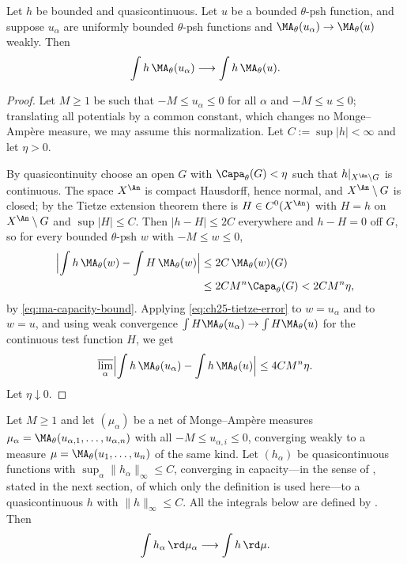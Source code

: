 \begin{lemma}
\label{lem:quasicontinuous-tests}
Let $h$ be bounded and quasicontinuous.  Let $u$ be a bounded
$\theta$-psh function, and suppose $u_\alpha$ are uniformly bounded
$\theta$-psh functions and
$\MA_\theta(u_\alpha)\to\MA_\theta(u)$ weakly. Then
\[
                    \int h\,\MA_\theta(u_\alpha)
                    \longrightarrow\int h\,\MA_\theta(u).
\]
\end{lemma}

\begin{proof}
Let $M\geq1$ be such that $-M\leq u_\alpha\leq0$ for all $\alpha$ and
$-M\leq u\leq0$; translating all potentials by a common constant, which
changes no Monge--Amp\`ere measure, we may assume this normalization.  Let
$C:=\sup|h|<\infty$ and let $\eta>0$.

By quasicontinuity choose an open $G$ with
$\Capa_\theta(G)<\eta$ such that $h|_{X^{\An}\setminus G}$ is continuous.
The space $X^{\An}$ is compact Hausdorff, hence normal, and
$X^{\An}\setminus G$ is closed; by the Tietze extension theorem there is
$H\in C^0(X^{\An})$ with $H=h$ on $X^{\An}\setminus G$ and
$\sup|H|\leq C$.  Then $|h-H|\leq2C$ everywhere and $h-H=0$ off
$G$, so for every bounded $\theta$-psh $w$ with $-M\leq w\leq0$,
\begin{equation}
\label{eq:ch25-tietze-error}
 \begin{aligned}
 \Bigl|\int h\,\MA_\theta(w)-\int H\,\MA_\theta(w)\Bigr|
 &\leq2C\,\MA_\theta(w)(G)\\
 &\leq2CM^n\Capa_\theta(G)<2CM^n\eta ,
 \end{aligned}
\end{equation}
by \eqref{eq:ma-capacity-bound}.  Applying
\eqref{eq:ch25-tietze-error} to $w=u_\alpha$ and to $w=u$, and using
weak convergence $\int H\MA_\theta(u_\alpha)\to\int H\MA_\theta(u)$ for the
continuous test function $H$, we get
\[
 \varlimsup_\alpha\Bigl|\int h\,\MA_\theta(u_\alpha)
   -\int h\,\MA_\theta(u)\Bigr|\leq4CM^n\eta .
\]
Let $\eta\downarrow0$.
\end{proof}

\begin{lemma}
\label{lem:ch25-joint-limit}
Let $M\geq1$ and let $(\mu_\alpha)$ be a net of Monge--Amp\`ere measures
$\mu_\alpha=\MA_\theta(u_{\alpha,1},\ldots,u_{\alpha,n})$ with all
$-M\leq u_{\alpha,i}\leq0$, converging weakly to a measure
$\mu=\MA_\theta(u_1,\ldots,u_n)$ of the same kind.  Let $(h_\alpha)$ be
quasicontinuous functions with $\sup_\alpha\|h_\alpha\|_\infty\leq C$,
converging in capacity---in the sense of
, stated in the next section, of which
only the definition is used here---to a quasicontinuous $h$ with
$\|h\|_\infty\leq C$.  All the integrals below are defined by
.  Then
\[
 \int h_\alpha\,\rd\mu_\alpha\longrightarrow\int h\,\rd\mu .
\]
\end{lemma}

